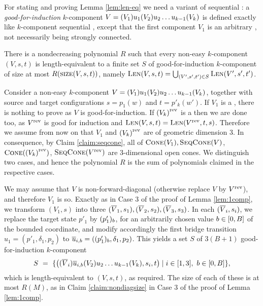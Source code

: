 For stating and proving Lemma \ref{lem:len-eq} we need a variant of sequential \tvass:
a \emph{good-for-induction} $k$-component \tvass $V=(V_1) u_1 (V_2) u_2 \ldots u_{k-1} (V_k)$ is defined exactly like $k$-component
sequential \tvass, except that the first component $V_1$ is an arbitrary \geomvass,
not necessarily being strongly connected.
%
\begin{lemma} \label{lem:len-eq}
There is a nondecreasing polynomial $R$ such that 
every non-easy $k$-component \tvass $(V, s, t)$ is length-equivalent to a finite set $S$ of good-for-induction
$k$-component \tvass
of size at most $R(\textsc{size}(V,s,t))$, namely
$\textsc{Len}(V, s, t) = \bigcup_{(V', s', t')\in S} \textsc{Len}(V', s', t')$.
\end{lemma}
%

\begin{appendixproof}
Consider a non-easy $k$-component \tvass $V = (V_1) u_1 (V_2) u_2 \ldots u_{k-1} (V_k)$, together with
source and target configurations $s = p_1(w)$ and $t=p'_k(w')$.
If $V_1$  is a \geomvass, there is nothing to prove as $V$ is good-for-induction.
If ${(V_k)}^{\text{rev}}$ is a \geomvass then we are done too, as ${V}^{\text{rev}}$ is good for induction and 
$\textsc{Len}(V, s, t) = \textsc{Len}({V}^{\text{rev}}, t, s)$.
Therefore we assume from now on that $V_1$ and ${(V_k)}^{\text{rev}}$ are of geometric dimension 3. 
In consequence, by Claim \ref{claim:seqcone}, all of $\textsc{Cone}(V_1), \textsc{SeqCone}(V)$, $\textsc{Cone}({(V_k)}^{\text{rev}})$, $\textsc{SeqCone}({V}^{\text{rev}})$ are
3-dimensional open cones.
We distinguish two cases, and hence the polynomial $R$ is the sum of polynomials claimed
in the respective cases.

%
We may assume \mywlog that $V$ is non-forward-diagonal (otherwise replace $V$ by ${V}^{\text{rev}}$),
and therefore $V_1$ is so.
Exactly as in Case 3 of the proof of Lemma \ref{lem:1comp}, we transform
$(V_1,s)$ into
three \geomvass $(\overline{V}_1, s_1), (\overline{V}_2, s_2), (\overline{V}_3, s_3)$.
In each $(\overline{V}_i, s_i)$, we replace the target state $p'_1$ by
$(p'_1)_{b}$, for an arbitrarily chosen value $b\in[0, B]$ of the bounded coordinate,
and modify accordingly the first bridge transition $u_1 = (p'_1, \delta_1, p_2)$ to 
$\overline{u}_{i, b} = ((p'_1)_{b}, \delta_1, p_2)$.
This yields a set $S$ of $3(B+1)$ good-for-induction $k$-component \tvass  
\[
S \ = \ \{\big((\overline{V}_i) \overline{u}_{i, b} (V_2) u_2 \ldots u_{k-1} (V_k), s_i, t \big) \mid i\in[1, 3], \ b\in [0, B]\},
\]
which is length-equivalent to $(V, s, t)$, as required. 
The size of each of these \tvass is
at most $R(M)$, as in Claim \ref{claim:nondiagsize} in Case 3 of the proof of Lemma \ref{lem:1comp}.


\end{appendixproof}
